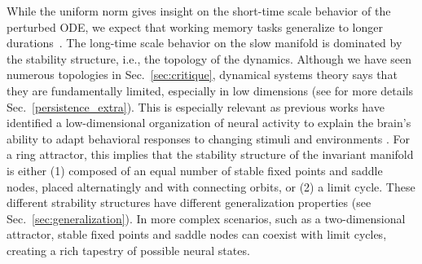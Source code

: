 \documentclass{article} %
\newcommand{\mpcomment}[1]{\textcolor{mpcolor}{(#1)}}
\newcommand{\pscomment}[1]{\textcolor{BurntOrange}{(#1)}}
\newcounter{ct}
\theoremstyle{definition}
\theoremstyle{remark}
\begin{document}
While the uniform norm gives insight on the short-time scale behavior of the perturbed ODE, we expect that working memory tasks generalize to longer durations~\citep{Park2023a}.
The long-time scale behavior on the slow manifold is dominated by the stability structure, i.e., the topology of the dynamics.
Although we have seen numerous topologies in Sec.~\ref{sec:critique}, dynamical systems theory says that they are fundamentally limited, especially in low dimensions (see for more details Sec.~\ref{persistence_extra}).
This is especially relevant as previous works have identified a low-dimensional organization of neural activity to explain the brain's ability to adapt behavioral responses to changing stimuli and environments \citep{beiran2023parametric,altan2023low,fanthomme2021low}.
For a ring attractor, this implies that the stability structure of the invariant manifold is either
(1) composed of an equal number of stable fixed points and saddle nodes, placed alternatingly and with connecting orbits, or (2) a limit cycle.
These different strability structures have different generalization properties (see Sec.~\ref{sec:generalization}).
In more complex scenarios, such as a two-dimensional attractor, stable fixed points and saddle nodes can coexist with limit cycles, creating a rich tapestry of possible neural states.
\end{document}
